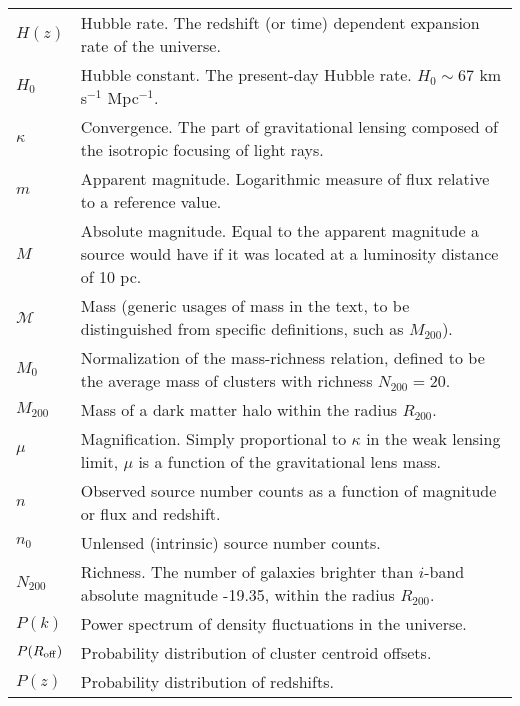 \begin{tabular}{p{0.6in}p{5.8in}}
$H(z)$ & Hubble rate. The redshift (or time) dependent expansion rate of the universe. \\
$H_0$ & Hubble constant. The present-day Hubble rate. $H_0 \sim 67$ km s$^{-1}$ Mpc$^{-1}$. \\
$\kappa$ & Convergence. The part of gravitational lensing composed of the isotropic focusing of light rays. \\
$m$ & Apparent magnitude. Logarithmic measure of flux relative to a reference value. \\
$M$ & Absolute magnitude. Equal to the apparent magnitude a source would have if it was located at a luminosity distance of 10 pc. \\
${\mathscr M}$ & Mass (generic usages of mass in the text, to be distinguished from specific definitions, such as $M_{200}$). \\
$M_0$ & Normalization of the mass-richness relation, defined to be the average mass of clusters with richness $N_{200} = 20$. \\
$M_{200}$ & Mass of a dark matter halo within the radius $R_{200}$. \\
$\mu$ & Magnification. Simply proportional to $\kappa$ in the weak lensing limit, $\mu$ is a function of the gravitational lens mass. \\
$n$ & Observed source number counts as a function of magnitude or flux and redshift. \\
$n_0$ & Unlensed (intrinsic) source number counts. \\
$N_{200}$ & Richness. The number of galaxies brighter than $i$-band absolute magnitude -19.35, within the radius $R_{200}$. \\
$P(k)$ & Power spectrum of density fluctuations in the universe. \\
$P(R_{\rm off})$ & Probability distribution of cluster centroid offsets. \\
$P(z)$ & Probability distribution of redshifts. \\

\end{tabular}
